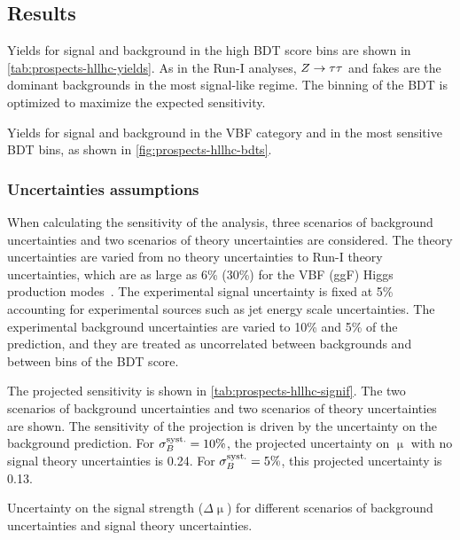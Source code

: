 \subsection{Results}

Yields for signal and background in the high BDT score bins are shown in \cref{tab:prospects-hllhc-yields}. As in the Run-I analyses, $Z\rightarrow\tau\tau$ and fakes are the dominant backgrounds in the most signal-like regime. The binning of the BDT is optimized to maximize the expected sensitivity.

\begin{table}[bp]
  \centering
  \renewcommand{\arraystretch}{1.4}
  \caption{Yields for signal and background in the VBF category and in the most sensitive BDT bins, as shown in \cref{fig:prospects-hllhc-bdts}.}
  
  \label{tab:prospects-hllhc-yields}
\end{table}

\subsubsection{Uncertainties assumptions}

When calculating the sensitivity of the analysis, three scenarios of background uncertainties and two scenarios of theory uncertainties are considered. The theory uncertainties are varied from no theory uncertainties to Run-I theory uncertainties, which are as large as 6\% (30\%) for the VBF (ggF) Higgs production modes~\cite{HIGG-2013-32}. The experimental signal uncertainty is fixed at 5\% accounting for experimental sources such as jet energy scale uncertainties. The experimental background uncertainties are varied to 10\% and 5\% of the prediction, and they are treated as uncorrelated between backgrounds and between bins of the BDT score.

The projected sensitivity is shown in \cref{tab:prospects-hllhc-signif}. The two scenarios of background uncertainties and two scenarios of theory uncertainties are shown. The sensitivity of the projection is driven by the uncertainty on the background prediction. For $\sigma_{B}^{\text{syst.}} = 10\%$, the projected uncertainty on $\upmu$ with no signal theory uncertainties is 0.24. For $\sigma_{B}^{\text{syst.}} = 5\%$, this projected uncertainty is 0.13.

\begin{table}[bp]
  \centering
  \renewcommand{\arraystretch}{1.4}
  \caption{Uncertainty on the signal strength ($\Delta\upmu$) for different scenarios of background uncertainties and signal theory uncertainties.}
  
  \label{tab:prospects-hllhc-signif}
\end{table}

